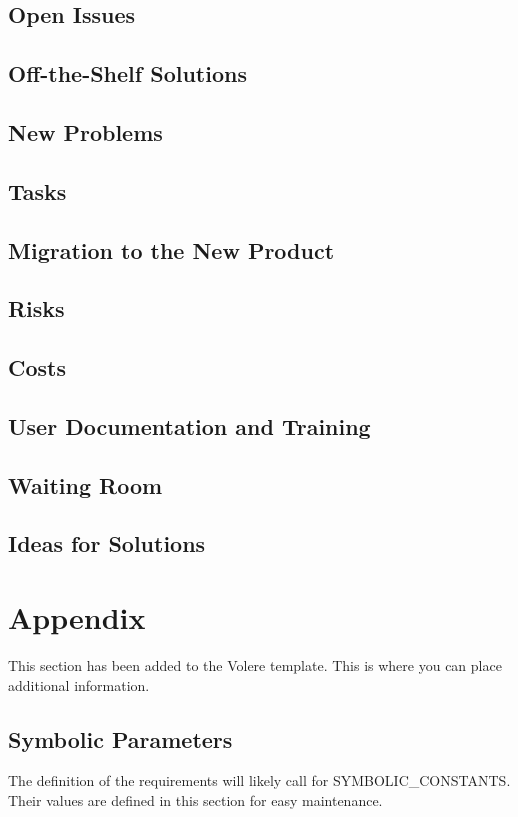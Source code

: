 \documentclass[12pt, titlepage]{article}
\begin{document}
\subsection{Open Issues}

\subsection{Off-the-Shelf Solutions}

\subsection{New Problems}

\subsection{Tasks}

\subsection{Migration to the New Product}

\subsection{Risks}

\subsection{Costs}

\subsection{User Documentation and Training}

\subsection{Waiting Room}

\subsection{Ideas for Solutions}





\newpage

\section{Appendix}

This section has been added to the Volere template.  This is where you can place
additional information.

\subsection{Symbolic Parameters}

The definition of the requirements will likely call for SYMBOLIC\_CONSTANTS.
Their values are defined in this section for easy maintenance.
\end{document}
